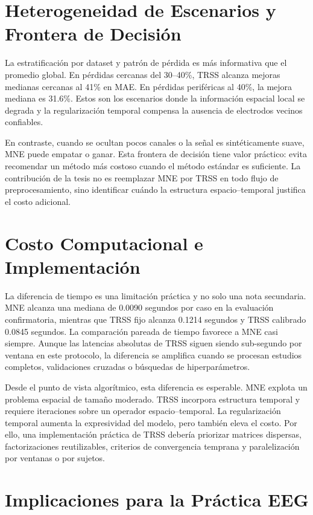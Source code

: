\section{Heterogeneidad de Escenarios y Frontera de Decisión}

La estratificación por dataset y patrón de pérdida es más informativa que el promedio global. En pérdidas cercanas del 30--40\%, TRSS alcanza mejoras medianas cercanas al 41\% en MAE. En pérdidas periféricas al 40\%, la mejora mediana es 31.6\%. Estos son los escenarios donde la información espacial local se degrada y la regularización temporal compensa la ausencia de electrodos vecinos confiables.

En contraste, cuando se ocultan pocos canales o la señal es sintéticamente suave, MNE puede empatar o ganar. Esta frontera de decisión tiene valor práctico: evita recomendar un método más costoso cuando el método estándar es suficiente. La contribución de la tesis no es reemplazar MNE por TRSS en todo flujo de preprocesamiento, sino identificar cuándo la estructura espacio--temporal justifica el costo adicional.

\section{Costo Computacional e Implementación}

La diferencia de tiempo es una limitación práctica y no solo una nota secundaria. MNE alcanza una mediana de 0.0090 segundos por caso en la evaluación confirmatoria, mientras que TRSS fijo alcanza 0.1214 segundos y TRSS calibrado 0.0845 segundos. La comparación pareada de tiempo favorece a MNE casi siempre. Aunque las latencias absolutas de TRSS siguen siendo sub-segundo por ventana en este protocolo, la diferencia se amplifica cuando se procesan estudios completos, validaciones cruzadas o búsquedas de hiperparámetros.

Desde el punto de vista algorítmico, esta diferencia es esperable. MNE explota un problema espacial de tamaño moderado. TRSS incorpora estructura temporal y requiere iteraciones sobre un operador espacio--temporal. La regularización temporal aumenta la expresividad del modelo, pero también eleva el costo. Por ello, una implementación práctica de TRSS debería priorizar matrices dispersas, factorizaciones reutilizables, criterios de convergencia temprana y paralelización por ventanas o por sujetos.

\section{Implicaciones para la Práctica EEG}

